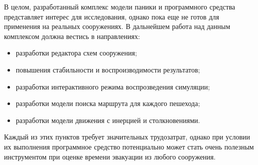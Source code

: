 В целом, разработанный комплекс модели паники и программного средства представляет интерес для исследования,
однако пока еще не готов для применения на реальных сооружениях.
В дальнейшем работа над данным комплексом должна вестись в направлениях:

\begin{itemize}
  \item разработки редактора схем сооружения;
  \item повышения стабильности и воспроизводимости результатов;
  \item разработки интерактивного режима воспрозведения симуляции;
  \item разработки модели поиска маршрута для каждого пешехода;
  \item разработки модели движения с инерцией и столкновениями.
\end{itemize}

Каждый из этих пунктов требует значительных трудозатрат, однако при условии их выполнения программное средство потенциально
может стать очень полезным инструментом при оценке времени эвакуации из любого сооружения.
